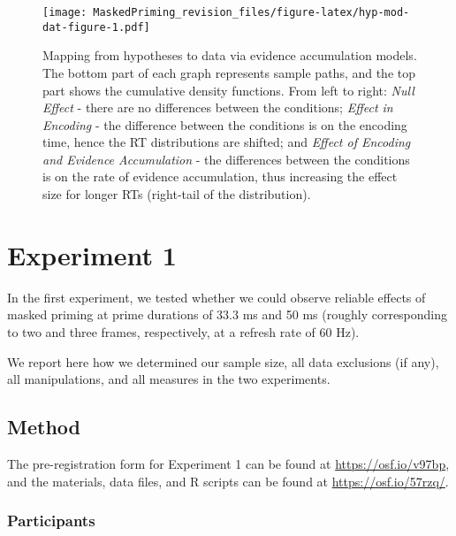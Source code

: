 \documentclass[
  english,
  man,floatsintext]{apa6}
\begin{document}
\newpage

\begin{figure}
\centering
\texttt{[image: MaskedPriming\_revision\_files/figure-latex/hyp-mod-dat-figure-1.pdf]}
\caption{\label{fig:hyp-mod-dat-figure}Mapping from hypotheses to data via evidence accumulation models. The bottom part of each graph represents sample paths, and the top part shows the cumulative density functions. From left to right: \emph{Null Effect} - there are no differences between the conditions; \emph{Effect in Encoding} - the difference between the conditions is on the encoding time, hence the RT distributions are shifted; and \emph{Effect of Encoding and Evidence Accumulation} - the differences between the conditions is on the rate of evidence accumulation, thus increasing the effect size for longer RTs (right-tail of the distribution).}
\end{figure}

\hypertarget{experiment-1}{%
\section{Experiment 1}\label{experiment-1}}

In the first experiment, we tested whether we could observe reliable effects of masked priming at prime durations of 33.3 ms and 50 ms (roughly corresponding to two and three frames, respectively, at a refresh rate of 60 Hz).

We report here how we determined our sample size, all data exclusions (if any), all manipulations, and all measures in the two experiments.

\hypertarget{method}{%
\subsection{Method}\label{method}}

The pre-registration form for Experiment 1 can be found at \url{https://osf.io/v97bp}, and the materials, data files, and R scripts can be found at \url{https://osf.io/57rzq/}.

\hypertarget{participants}{%
\subsubsection{Participants}\label{participants}}
\end{document}
